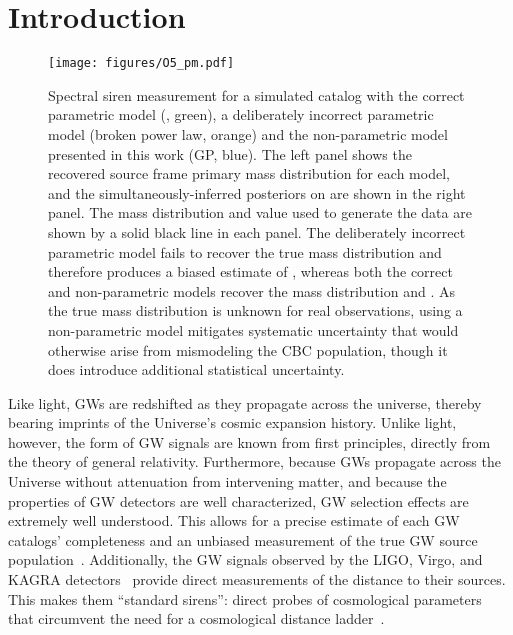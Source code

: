 \documentclass[preprint2,linenumbers]{aastex631}
\begin{document}
\section{Introduction}
\label{sec:intro}
\begin{figure*}
    \centering
    \texttt{[image: figures/O5\_pm.pdf]}
    \caption{Spectral siren measurement for a simulated catalog with the correct parametric model (\plp, green), a deliberately incorrect parametric model (broken power law, orange) and the non-parametric model presented in this work (\acl{GP}, blue).
    The left panel shows the recovered source frame primary mass distribution for each model, and the simultaneously-inferred posteriors on \Ho{} are shown in the right panel.
    The mass distribution and \Ho{} value used to generate the data are shown by a solid black line in each panel. 
    The deliberately incorrect parametric model fails to recover the true mass distribution and therefore produces a biased estimate of \Ho{}, whereas both the correct and non-parametric models recover  the mass distribution and \Ho{}.
    As the true mass distribution is unknown for real observations, using a non-parametric model mitigates systematic uncertainty that would otherwise arise from mismodeling the \ac{CBC} population, though it does introduce additional statistical uncertainty.
    }
    \label{fig:O5_GP}
\end{figure*}

Like light, \acp{GW} are redshifted as they propagate across the universe, thereby bearing imprints of the Universe's cosmic expansion history.
Unlike light, however, the form of \ac{GW} signals are known from first principles, directly from the theory of general relativity. Furthermore, because \acp{GW} propagate across the Universe without attenuation from intervening matter, and because the properties of \ac{GW} detectors are well characterized, \ac{GW} selection effects are extremely well understood.%
This allows for a precise estimate of each \ac{GW} catalogs' completeness and an unbiased measurement of the true \ac{GW} source population~\citep{2023PhRvX..13d1039A,abbott_population_2023,2023PhRvD.108d3011E}. 
Additionally, the \ac{GW} signals observed by the LIGO, Virgo, and KAGRA detectors~\citep{aasi_advanced_2015,acernese_advanced_2014,akutsu_overview_2021}  provide direct measurements of the distance to their sources.
This makes them ``standard sirens'': direct probes of cosmological parameters that circumvent the need for a cosmological distance ladder~\citep{schutz_determining_1986,holz_using_2005}. 
\end{document}
